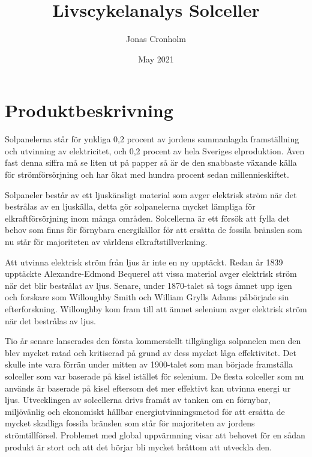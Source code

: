 \documentclass{article}
\title{Livscykelanalys Solceller}
\author{Jonas Cronholm}
\date{May 2021}
\begin{document}
	\maketitle
	\pagebreak
	\tableofcontents
	\pagebreak
	
\section{Produktbeskrivning}
Solpanelerna står för ynkliga 0,2 procent av jordens sammanlagda framställning och utvinning av elektricitet, och 0,2 procent av hela Sveriges elproduktion. Även fast denna siffra må se liten ut på papper så är de den snabbaste växande källa för strömförsörjning och har ökat med hundra procent sedan millennieskiftet.
  
Solpaneler består av ett ljuskänsligt material som avger elektrisk ström när det bestrålas av en ljuskälla, detta gör solpanelerna mycket lämpliga för elkraftförsörjning inom många områden. Solcellerna är ett försök att fylla det behov som finns för förnybara energikällor för att ersätta de fossila bränslen som nu står för majoriteten av världens elkraftstillverkning. 

Att utvinna elektrisk ström från ljus är inte en ny upptäckt. Redan år 1839 upptäckte Alexandre-Edmond Bequerel att vissa material avger elektrisk ström när det blir bestrålat av ljus.
Senare, under 1870-talet så togs ämnet upp igen och forskare som Willoughby Smith och William Grylls Adams påbörjade sin efterforskning. Willoughby kom fram till att ämnet selenium avger elektrisk ström när det bestrålas av ljus.

Tio år senare lanserades den första kommersiellt tillgängliga solpanelen men den blev mycket ratad och kritiserad på grund av dess mycket låga effektivitet. Det skulle inte vara förrän under mitten av 1900-talet som man började framställa solceller som var baserade på kisel istället för selenium. De flesta solceller som nu används är baserade på kisel eftersom det mer effektivt kan utvinna energi ur ljus. Utvecklingen av solcellerna drivs framåt av tanken om en förnybar, miljövänlig och ekonomiskt hållbar energiutvinningsmetod för att ersätta de mycket skadliga fossila bränslen som står för majoriteten av jordens strömtillförsel. Problemet med global uppvärmning visar att behovet för en sådan produkt är stort och att det börjar bli mycket bråttom att utveckla den. 
\end{document}
